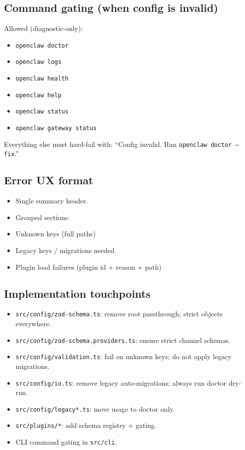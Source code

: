 \subsection{Command gating (when config is invalid)}


Allowed (diagnostic-only):

\begin{itemize}
  \item \texttt{openclaw doctor}
  \item \texttt{openclaw logs}
  \item \texttt{openclaw health}
  \item \texttt{openclaw help}
  \item \texttt{openclaw status}
  \item \texttt{openclaw gateway status}
\end{itemize}


Everything else must hard-fail with: “Config invalid. Run \texttt{openclaw doctor --fix}.”

\subsection{Error UX format}


\begin{itemize}
  \item Single summary header.
  \item Grouped sections:
  \item Unknown keys (full paths)
  \item Legacy keys / migrations needed
  \item Plugin load failures (plugin id + reason + path)
\end{itemize}


\subsection{Implementation touchpoints}


\begin{itemize}
  \item \texttt{src/config/zod-schema.ts}: remove root passthrough; strict objects everywhere.
  \item \texttt{src/config/zod-schema.providers.ts}: ensure strict channel schemas.
  \item \texttt{src/config/validation.ts}: fail on unknown keys; do not apply legacy migrations.
  \item \texttt{src/config/io.ts}: remove legacy auto-migrations; always run doctor dry-run.
  \item \texttt{src/config/legacy*.ts}: move usage to doctor only.
  \item \texttt{src/plugins/*}: add schema registry + gating.
  \item CLI command gating in \texttt{src/cli}.
\end{itemize}


